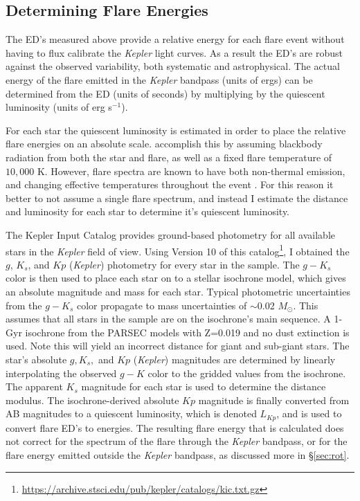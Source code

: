 \documentclass[twocolumn]{aastex6}
\newcommand{\Kepler}{\textsl{Kepler}\xspace}
\begin{document}
\subsection{Determining Flare Energies}
\label{sec:find3}

The ED's measured above provide a relative energy for each flare event without having to flux calibrate the \Kepler light curves. As a result the ED's are robust against the observed variability, both systematic and astrophysical. The actual energy of the flare emitted in the \Kepler bandpass (units of ergs) can be determined from the ED (units of seconds) by multiplying by the quiescent luminosity (units of erg s$^{-1}$).

For each star the quiescent luminosity is estimated in order to place the relative flare energies on an absolute scale.
\citet{shibayama2013} accomplish this by assuming blackbody radiation from both the star and flare, as well as a fixed flare temperature of $10,000$ K. However, flare spectra are known to have both non-thermal emission, and changing effective temperatures throughout the event \citep{kowalski2013}. For this reason it better to not assume a single flare spectrum, and instead I estimate the distance and luminosity for each star to determine it's quiescent luminosity.

The Kepler Input Catalog provides ground-based photometry for all available stars in the \Kepler field of view. Using Version 10 of this catalog\footnote{\url{https://archive.stsci.edu/pub/kepler/catalogs/kic.txt.gz}}, I obtained the $g$,  $K_s$, and $Kp$ (\Kepler) photometry for every star in the sample. The $g-K_s$ color is then used to place each star on to a stellar isochrone model, which gives an absolute magnitude and mass for each star. Typical photometric uncertainties from the $g-K_s$ color propagate to mass uncertainties of $\sim$0.02 $M_\odot$.
This assumes that all stars in the sample are on the isochrone's main sequence. A 1-Gyr isochrone from the PARSEC models \citep{bressan2012} with Z=0.019 and no dust extinction is used. Note this will yield an incorrect distance for giant and sub-giant stars. The star's absolute $g, K_s,$ and $Kp$ (\Kepler) magnitudes are determined by linearly interpolating the observed $g-K$ color to the gridded values from the isochrone. The apparent $K_s$ magnitude for each star is used to determine the distance modulus. The isochrone-derived absolute $Kp$ magnitude is finally converted from AB magnitudes to a quiescent luminosity, which is denoted $L_{Kp}$, and is used to convert flare ED's to energies. The resulting flare energy that is calculated does not correct for the spectrum of the flare through the \Kepler bandpass, or for the flare energy emitted outside the \Kepler bandpass, as discussed more in \S\ref{sec:rot}.
\end{document}
